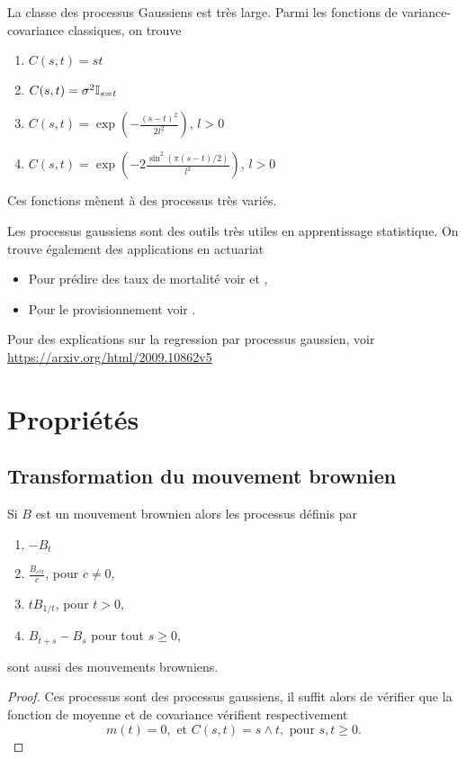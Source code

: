 La classe des processus Gaussiens est très large. Parmi les fonctions de variance-covariance classiques, on trouve 
\begin{enumerate}
  \item $C(s,t) = st$
  \item $C(s,t) = \sigma^2 \mathbb{I}_{s=t}$
  \item $C(s,t) = \exp\left(-\frac{(s-t)^2}{2l^2}\right)$, $l>0$
  \item $C(s,t) = \exp\left(-2\frac{\sin^2(\pi(s-t)/2)}{l^2}\right)$, $l>0$
\end{enumerate}
Ces fonctions mènent à des processus très variés.
\begin{remark}
Les processus gaussiens sont des outils très utiles en apprentissage statistique. On trouve également des applications en actuariat
\begin{itemize}
  \item Pour prédire des taux de mortalité voir \citet{Huynh2021} et \citet{Wu2018},
  \item Pour le provisionnement voir \citet{Ludkovski2022}.
\end{itemize}
Pour des explications sur la regression par processus gaussien, voir \url{https://arxiv.org/html/2009.10862v5}
\end{remark}
\section{Propriétés}
\subsection{Transformation du mouvement brownien}
\begin{prop}
Si $B$ est un mouvement brownien alors les processus définis par 
\begin{enumerate}
  \item $-B_t$
  \item $\frac{B_{c^2 t}}{c}$, pour $c\neq 0$,
  \item $t B_{1/t}$, pour $t> 0$,
  \item $B_{t+s}-B_s$ pour tout $s\geq 0$,
\end{enumerate}
sont aussi des mouvements browniens.
\end{prop}
\begin{proof}
Ces processus sont des processus gaussiens, il suffit alors de vérifier que la fonction de moyenne et de covariance vérifient respectivement
$$
m(t) = 0,\text{ et }C(s,t)=s\land t,\text{ pour }s,t\geq 0.
$$
\end{proof}
